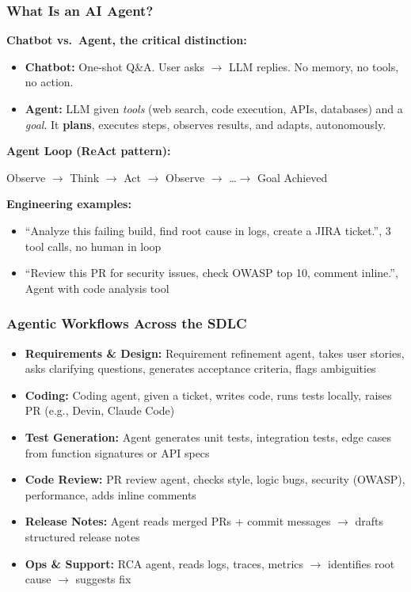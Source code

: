 \begin{frame}[fragile]\frametitle{What Is an AI Agent?}
\textbf{Chatbot vs.\ Agent, the critical distinction:}
\begin{itemize}
\item \textbf{Chatbot:} One-shot Q\&A. User asks $\rightarrow$ LLM replies. No memory, no tools, no action.
\item \textbf{Agent:} LLM given \textit{tools} (web search, code execution, APIs, databases) and a \textit{goal}. It \textbf{plans}, executes steps, observes results, and adapts, autonomously.
\end{itemize}

\textbf{Agent Loop (ReAct pattern):}
\begin{center}
Observe $\rightarrow$ Think $\rightarrow$ Act $\rightarrow$ Observe $\rightarrow$ \ldots $\rightarrow$ Goal Achieved
\end{center}

\textbf{Engineering examples:}
\begin{itemize}
\item ``Analyze this failing build, find root cause in logs, create a JIRA ticket.'', 3 tool calls, no human in loop
\item ``Review this PR for security issues, check OWASP top 10, comment inline.'', Agent with code analysis tool
\end{itemize}
\end{frame}

\begin{frame}[fragile]\frametitle{Agentic Workflows Across the SDLC}
\begin{itemize}
\item \textbf{Requirements \& Design:}
  Requirement refinement agent, takes user stories, asks clarifying questions, generates acceptance criteria, flags ambiguities
\item \textbf{Coding:}
  Coding agent, given a ticket, writes code, runs tests locally, raises PR (e.g., Devin, Claude Code)
\item \textbf{Test Generation:}
  Agent generates unit tests, integration tests, edge cases from function signatures or API specs
\item \textbf{Code Review:}
  PR review agent, checks style, logic bugs, security (OWASP), performance, adds inline comments
\item \textbf{Release Notes:}
  Agent reads merged PRs + commit messages $\rightarrow$ drafts structured release notes
\item \textbf{Ops \& Support:}
  RCA agent, reads logs, traces, metrics $\rightarrow$ identifies root cause $\rightarrow$ suggests fix
\end{itemize}
\end{frame}

